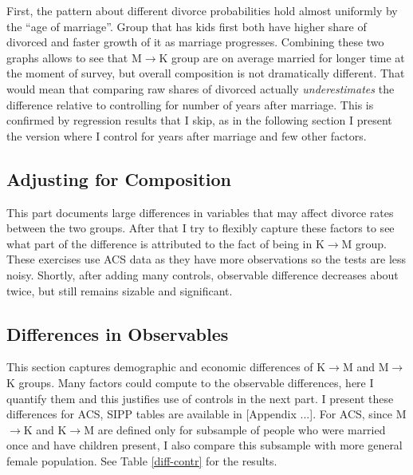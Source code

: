 \documentclass[12pt,letter]{article}
\begin{document}
First, the pattern about different divorce probabilities hold almost uniformly by the ``age of marriage''. Group that has kids first both have higher share of divorced and faster growth of it as marriage progresses. Combining these two graphs allows to see that M$\to$K group are on average married for longer time at the moment of survey, but overall composition is not dramatically different. That would mean that comparing raw shares of divorced actually \emph{underestimates} the difference relative to controlling for number of years after marriage. This is confirmed by regression results that I skip, as in the following section I present the version where I control for years after marriage and few other factors.

\subsection{Adjusting for Composition}

This part documents large differences in variables that may affect divorce rates between the two groups. After that I try to flexibly capture these factors to see what part of the difference is attributed to the fact of being in K$\to$M group. These exercises use ACS data as they have more observations so the tests are less noisy. Shortly, after adding many controls, observable difference decreases about twice, but still remains sizable and significant. 


\subsection{Differences in Observables}
This section captures demographic and economic differences of K$\to$M and M$\to$K groups. Many factors could compute to the observable differences, here I quantify them and this justifies use of controls in the next part. I present these differences for ACS, SIPP tables are available in [Appendix ...]. For ACS, since M$\to$K and K$\to$M are defined only for subsample of people who were married once and have children present, I also compare this subsample with more general female population. See Table \ref{diff-contr} for the results.
\end{document}
